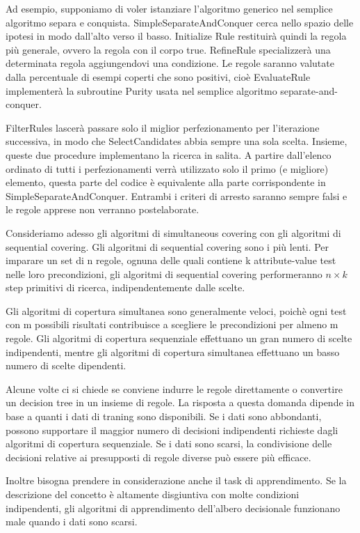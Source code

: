 \documentclass[a4paper]{extarticle}
\begin{document}
Ad esempio, supponiamo di voler istanziare l'algoritmo generico nel semplice algoritmo separa e conquista. SimpleSeparateAndConquer cerca nello spazio delle ipotesi in modo dall'alto verso il basso. Initialize Rule restituirà quindi la regola più generale, ovvero la regola con il corpo {true}. RefineRule specializzerà una determinata regola aggiungendovi una condizione. Le regole saranno valutate dalla percentuale di esempi coperti che sono positivi, cioè EvaluateRule implementerà la subroutine Purity usata nel semplice algoritmo separate-and-conquer.

FilterRules lascerà passare solo il miglior perfezionamento per l'iterazione successiva, in modo che SelectCandidates abbia sempre una sola scelta. Insieme, queste due procedure implementano la ricerca in salita. A partire dall'elenco ordinato di tutti i perfezionamenti verrà utilizzato solo il primo (e migliore) elemento, questa parte del codice è equivalente alla parte corrispondente in SimpleSeparateAndConquer. Entrambi i criteri di arresto saranno sempre falsi e le regole apprese non verranno postelaborate.

Consideriamo adesso gli algoritmi di simultaneous covering con gli algoritmi di sequential covering. Gli algoritmi di sequential covering sono i più lenti. Per imparare un set di n regole, ognuna delle quali contiene k attribute-value test nelle loro precondizioni, gli algoritmi di sequential covering performeranno $n \times k$ step primitivi di ricerca, indipendentemente dalle scelte.

Gli algoritmi di copertura simultanea sono generalmente veloci, poichè ogni test con m possibili risultati contribuisce a scegliere le precondizioni per almeno m regole. Gli algoritmi di copertura sequenziale effettuano un gran numero di scelte indipendenti, mentre gli algoritmi di copertura simultanea effettuano un basso numero di scelte dipendenti.

Alcune volte ci si chiede se conviene indurre le regole direttamente o convertire un decision tree in un insieme di regole. La risposta a questa domanda dipende in base a quanti i dati di traning sono disponibili. Se i dati sono abbondanti, possono supportare il maggior numero di decisioni indipendenti richieste dagli algoritmi di copertura sequenziale. Se i dati sono scarsi, la condivisione delle decisioni relative ai presupposti di regole diverse può essere più efficace.

Inoltre bisogna prendere in considerazione anche il task di apprendimento. Se la descrizione del concetto è altamente disgiuntiva con molte condizioni indipendenti, gli algoritmi di apprendimento dell'albero decisionale funzionano male quando i dati sono scarsi.
\end{document}
